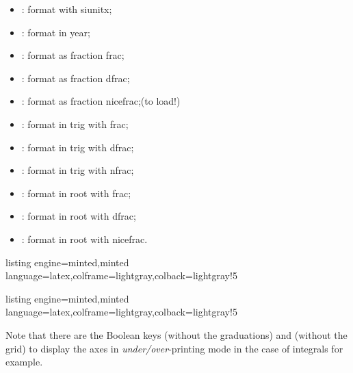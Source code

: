 \documentclass[11pt,a4paper]{ltxdoc}
\begin{document}
\begin{itemize}
	\item {}: format with \textsf{siunitx};
	\item {}: format in year;
	\item {}: format as fraction \textsf{frac};
	\item {}: format as fraction \textsf{dfrac};
	\item {}: format as fraction \textsf{nicefrac};\hfill (to load!)
	\item {}: format in trig with \textsf{frac};
	\item {}: format in trig with \textsf{dfrac};
	\item {}: format in trig with \textsf{nfrac};
	\item {}: format in root with \textsf{frac};
	\item {}: format in root with \textsf{dfrac};
	\item {}: format in root with \textsf{nicefrac}.
\end{itemize}

\smallskip

\begin{tcblisting}{listing engine=minted,minted language=latex,colframe=lightgray,colback=lightgray!5}
\begin{GraphTikz}
	[x=0.075cm,y=0.03cm,Xmin=0,Xmax=160,Xgrid=20,Xgrids=10,
	Origy=250,Ymin=250,Ymax=400,Ygrid=25,Ygrids=5]
\end{GraphTikz}
\end{tcblisting}

\begin{tcblisting}{listing engine=minted,minted language=latex,colframe=lightgray,colback=lightgray!5}
\begin{GraphTikz}%
	[x=0.9cm,y=0.425cm,Xmin=4,Xmax=20,Origx=4,
	Ymin=40,Ymax=56,Ygrid=2,Ygrids=1,Origy=40]
\end{GraphTikz}
\end{tcblisting}

Note that there are the Boolean keys \MontreCode{[Behind]} (without the graduations) and \MontreCode{[Above]} (without the grid) to display the axes in \textit{under/over}-printing mode in the case of integrals for example.
\end{document}
